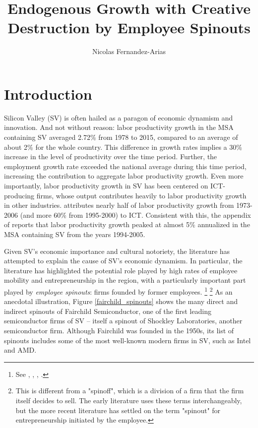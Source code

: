 \documentclass[12pt,english]{article}
\theoremstyle{remark}
\begin{document}
	
\title{Endogenous Growth with Creative Destruction by Employee Spinouts}
\author{Nicolas Fernandez-Arias}
\maketitle

\section{Introduction}
Silicon Valley (SV) is often hailed as a paragon of economic dynamism and innovation. And not without reason: labor productivity growth in the MSA containing SV averaged 2.72\% from 1978 to 2015, compared to an average of about 2\% for the whole country. This difference in growth rates implies a 30\% increase in the level of productivity over the time period. Further, the employment growth rate exceeded the national average during this time period, increasing the contribution to aggregate labor productivity growth. Even more importantly, labor productivity growth in SV has been centered on ICT-producing firms, whose output contributes heavily to labor productivity growth in other industries. \cite{jorgenson_retrospective_2008} attributes nearly half of labor productivity growth from 1973-2006 (and more 60\% from 1995-2000) to ICT. Consistent with this, the appendix of  \cite{parilla_understanding_2017} reports that labor productivity growth peaked at almost 5\% annualized in the MSA containing SV from the years 1994-2005.  

Given SV's economic importance and cultural notoriety, the literature has attempted to explain the cause of SV's economic dynamism. In particular, the literature has highlighted the potential role played by high rates of employee mobility and entrepreneurship in the region, with a particularly important part played by \textit{employee spinouts}: firms founded by former employees. \footnote{See \cite{saxenian_regional_1994}, \cite{gilson_legal_1999}, \cite{fallick_job-hopping_2006}, \cite{franco_covenants_2008}.} \footnote{This is different from a "spinoff", which is a division of a firm that the firm itself decides to sell. The early literature uses these terms interchangeably, but the more recent literature has settled on the term "spinout" for entrepreneurship initiated by the employee.} As an anecdotal illustration, Figure \ref{fairchild_spinouts} shows the many direct and indirect spinouts of Fairchild Semiconductor, one of the first leading semiconductor firms of SV -- itself a spinout of Shockley Laboratories, another semiconductor firm. Although Fairchild was founded in the 1950s, its list of spinouts includes some of the most well-known modern firms in SV, such as Intel and AMD. 
\end{document}
